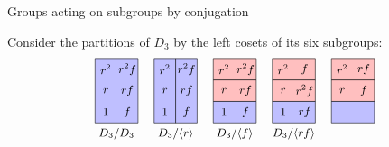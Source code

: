 \documentclass[8pt]{beamer}
\begin{document}
\begin{frame}{Groups acting on subgroups by conjugation}
  
  Consider the partitions of $D_3$ by the left cosets of its six subgroups:
  \[
  \begin{tikzpicture}[scale=.6]
    \tikzstyle{every node}=[font=\small]
    \begin{scope}[shift={(0,0)}]
      \draw[thin,fill=boxBlue] (0,0) rectangle (2,3);
      \node at (.5,2.5) {$r^2$}; \node at (1.5,2.5) {$r^2f$};
      \node at (.5,1.5) {$r$}; \node at (1.5,1.5) {$rf$};
      \node at (.5,.5) {$1$}; \node at (1.5,.5) {$f$};
      \node at (1,-.5) {$D_3/D_3$};
    \end{scope}
    \begin{scope}[shift={(2.75,0)}]
      \draw[thin,fill=boxBlue] (0,0) rectangle (1,3);
      \draw[thin,fill=boxBlue] (1,0) rectangle (2,3);
      \node at (.5,2.5) {$r^2$}; \node at (1.5,2.5) {$r^2f$};
      \node at (.5,1.5) {$r$}; \node at (1.5,1.5) {$rf$};
      \node at (.5,.5) {$1$}; \node at (1.5,.5) {$f$};
      \node at (1,-.5) {$D_3/\<r\>$};
    \end{scope}
    \begin{scope}[shift={(5.5,0)}]
      \draw[thin,fill=boxRed] (0,2) rectangle (2,3);
      \draw[thin,fill=boxRed] (0,1) rectangle (2,2);
      \draw[thin,fill=boxBlue] (0,0) rectangle (2,1);
      \node at (.5,2.5) {$r^2$}; \node at (1.5,2.5) {$r^2f$};
      \node at (.5,1.5) {$r$}; \node at (1.5,1.5) {$rf$};
      \node at (.5,.5) {$1$}; \node at (1.5,.5) {$f$};
      \node at (1,-.5) {$D_3/\<f\>$};
    \end{scope}
    \begin{scope}[shift={(8.25,0)}]
      \draw[thin,fill=boxRed] (0,2) rectangle (2,3);
      \draw[thin,fill=boxRed] (0,1) rectangle (2,2);
      \draw[thin,fill=boxBlue] (0,0) rectangle (2,1);
      \node at (.5,2.5) {$r^2$}; \node at (1.5,2.5) {$f$};
      \node at (.5,1.5) {$r$}; \node at (1.5,1.5) {$r^2f$};
      \node at (.5,.5) {$1$}; \node at (1.5,.5) {$rf$};
      \node at (1,-.5) {$D_3/\<rf\>$};
    \end{scope}
    \begin{scope}[shift={(11,0)}]
      \draw[thin,fill=boxRed] (0,2) rectangle (2,3);
      \draw[thin,fill=boxRed] (0,1) rectangle (2,2);
      \draw[thin,fill=boxBlue] (0,0) rectangle (2,1);
      \node at (.5,2.5) {$r^2$}; \node at (1.5,2.5) {$rf$};
      \node at (.5,1.5) {$r$}; \node at (1.5,1.5) {$f$};

\end{scope}
\end{tikzpicture}\]
\end{frame}
\end{document}

